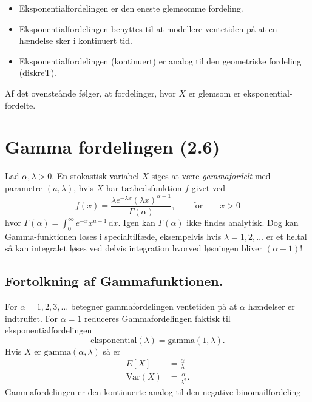 \begin{itemize}
  \item Eksponentialfordelingen er den eneste glemsomme fordeling.
  \item Eksponentialfordelingen benyttes til at modellere ventetiden på at en hændelse sker i kontinuert tid.
  \item Eksponentialfordelingen (kontinuert) er analog til den geometriske fordeling (diskreT).
\end{itemize}

Af det ovensteånde følger, at fordelinger, hvor $X$ er glemsom er eksponential-fordelte. 



\section{Gamma fordelingen (2.6)}

\begin{definition} 
  Lad $\alpha, \lambda > 0$. En stokastisk variabel $X$ siges at være \textit{gammafordelt} med parametre $(a, \lambda)$, hvis $X$ har tæthedsfunktion $f$ givet ved
  \[ 
  f(x) = \frac{\lambda e^{-\lambda x} \left( \lambda x \right)^{\alpha-1}}{\Gamma(\alpha)}, \qquad \text{for} \qquad x > 0
  \]
  hvor $\Gamma(\alpha) = \int_{0}^{\infty} e^{-x}x^{a-1} \, \mathrm{d}x$. Igen kan $\Gamma(\alpha)$ ikke findes analytisk. Dog kan Gamma-funktionen løses i specialtilfæde, eksempelvis hvis $\lambda = 1, 2, \ldots$ er et heltal så kan integralet løses ved delvis integration hvorved løsningen bliver $(\alpha-1)!$
\end{definition}

\subsection{Fortolkning af Gammafunktionen.}
For $\alpha = 1, 2, 3, \ldots $ betegner gammafordelingen ventetiden på at $\alpha$ hændelser er indtruffet. For $\alpha = 1$ reduceres Gammafordelingen faktisk til eksponentialfordelingen
\[ 
\mathrm{eksponential}(\lambda) = \mathrm{gamma}(1, \lambda)
.\]
Hvis $X$ er $\mathrm{gamma}(\alpha, \lambda)$ så er
\begin{align*}
  E[X] &= \frac{\alpha}{\lambda} \\
  \mathrm{Var}(X) &= \frac{\alpha}{\lambda^2}
.\end{align*}
Gammafordelingen er den kontinuerte analog til den negative binomailfordeling


